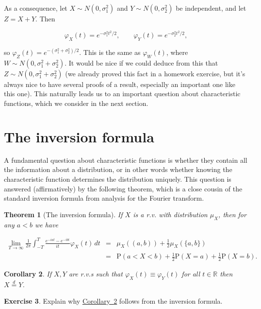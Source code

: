 \documentclass[11pt]{report}
\newcommand{\R}{\mathbb{R}}
\theoremstyle{plain}
\newtheorem{thm}{Theorem}[chapter]
\newtheorem{cor}[thm]{Corollary}
\theoremstyle{definition}
\newtheorem{xexercise}[thm]{Exercise}
\begin{document}
\noindent As a consequence, let $X\sim N(0,\sigma_1^2)$ and
$Y\sim N(0,\sigma_2^2)$ be independent, and let
$Z=X+Y$. Then

\[
\varphi_X(t) = e^{-\sigma_1^2 t^2/2}, \qquad \varphi_Y(t) = e^{-\sigma_2^2 t^2/2},
\]

\noindent so $\varphi_Z(t) = e^{-(\sigma_1^2+\sigma_2^2)/2}$.
This is the same as $\varphi_W(t)$, where
$W\sim N(0,\sigma_1^2+\sigma_2^2)$. It would be nice
if we could deduce from this that
$Z \sim N(0,\sigma_1^2+\sigma_2^2)$ (we already
proved this fact in a homework exercise, but it's
always nice to have several proofs of a result,
especially an important one like this one). This
naturally leads us to an important question about
characteristic functions, which we consider in the
next section.

\section{The inversion formula}

A fundamental question about characteristic functions
is whether they contain all the information about a
distribution, or in other words whether knowing the
characteristic function determines the distribution
uniquely. This question is answered (affirmatively) by
the following theorem, which is a close cousin of the
standard inversion formula from analysis for the
Fourier transform.

\begin{thm}[The inversion formula]
\label{thm-inversion}
If $X$ is a r.v. with distribution $\mu_X$, then for
any $a<b$ we have

\begin{eqnarray*} \lim_{T\to\infty} \frac{1}{2\pi} \int_{-T}^T \frac{e^{-iat}-e^{-ibt}}{it}\varphi_X(t)\,dt &=& \mu_X((a,b)) + \frac12
\mu_X(\{a,b\}) \\ &=& \mathrm{P}(a<X<b) + \frac12 \mathrm{P}(X=a)+\frac12 \mathrm{P}(X=b).
\end{eqnarray*}

\end{thm}

\begin{cor}
\label{cor:charfun-uniqueness}
If $X,Y$ are r.v.s such that
$\varphi_X(t)\equiv \varphi_Y(t)$ for all $t\in\R$
then $X \stackrel{d}{=} Y$.
\end{cor}

\begin{xexercise}
Explain why \hyperref[cor:charfun-uniqueness]{Corollary~\ref*{cor:charfun-uniqueness}}
follows from the inversion formula.
\end{xexercise}
\end{document}
